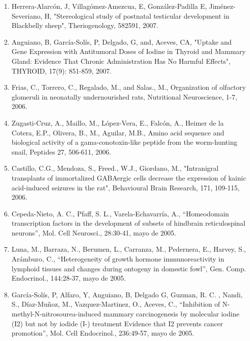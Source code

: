 \begin{enumerate}
\item Herrera-Alarcón, J, Villagómez-Amezcua, E, González-Padilla E, Jiménez-Severiano, H, "Stereological study of postnatal testicular development in Blackbelly 
sheep", Theriogenology, 582591,  2007.

\item Anguiano, B, García-Solís, P, Delgado, G, and, Aceves, CA, "Uptake and Gene Expression with Antitumoral Doses of Iodine in Thyroid and Mammary Gland: 
Evidence That Chronic Administration Has No Harmful Effects", THYROID, 17(9): 851-859,  2007.

\item Frias, C., Torrero, C., Regalado, M., and Salas., M., Organization of olfactory glomeruli in neonatally undernourished rats, Nutritional Neuroscience, 1-7,  
2006.

\item Zugasti-Cruz, A., Maillo, M., López-Vera, E., Falcón, A., Heimer de la Cotera, E.P., Olivera, B., M., Aguilar, M.B., Amino acid sequence and biological 
activity of a gama-conotoxin-like peptide from the worm-hunting snail, Peptides 27, 506-611,  2006.

\item Castillo, C.G., Mendoza, S., Freed., W.J., Giordano, M., "Intranigral transplants of immortalized GABAergic cells decrease the expression of kainic 
acid-induced seizures in the rat", Behavioural Brain Research, 171, 109-115,  2006.

\item Cepeda-Nieto, A. C., Pfaff, S. L., Varela-Echavarría, A., “Homeodomain transcription factors in the development of subsets of hindbrain reticulospinal 
neurons”, Mol. Cell Neurosci., 28:30-41,  mayo de 2005.

\item Luna, M., Barraza, N., Berumen, L., Carranza, M., Pedernera, E., Harvey, S., Arámburo, C., “Heterogeneity of growth hormone immunoreactivity in lymphoid 
tissues and changes during ontogeny in domestic fowl”, Gen. Comp. Endocrinol., 144:28-37,  mayo de 2005.

\item García-Solís, P, Alfaro, Y, Anguiano, B, Delgado G, Guzman, R. C. , Nandi, S., Díaz-Muñoz, M., Vazquez-Martinez, O., Aceves, C., “Inhibition of 
N-methyl-N-nitrosourea-induced mammary carcinogenesis by molecular iodine (I2) but not by iodide (I-) treatment Evidence that I2 prevents cancer promotion”, 
Mol. Cell Endocrinol., 236:49-57,  mayo de 2005.


\end{enumerate}
